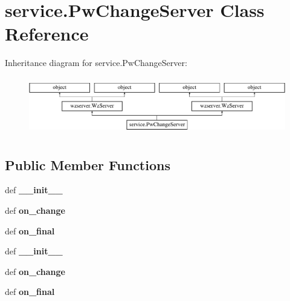 \hypertarget{classservice_1_1PwChangeServer}{\section{service.\-Pw\-Change\-Server Class Reference}
\label{classservice_1_1PwChangeServer}
}
Inheritance diagram for service.\-Pw\-Change\-Server\-:\begin{figure}[H]
\begin{center}
\leavevmode
\includegraphics[height=2.530120cm]{classservice_1_1PwChangeServer}
\end{center}
\end{figure}
\subsection*{Public Member Functions}
\begin{DoxyCompactItemize}
\item 
\hypertarget{classservice_1_1PwChangeServer_a4fb6862da925977587bd74bd261a8701}{def {\bfseries \-\_\-\-\_\-init\-\_\-\-\_\-}}\label{classservice_1_1PwChangeServer_a4fb6862da925977587bd74bd261a8701}

\item 
\hypertarget{classservice_1_1PwChangeServer_a6d3a67a350bc6f6310632b93d3b9dc76}{def {\bfseries on\-\_\-change}}\label{classservice_1_1PwChangeServer_a6d3a67a350bc6f6310632b93d3b9dc76}

\item 
\hypertarget{classservice_1_1PwChangeServer_a1364ecbaf8211611b793345d73249eac}{def {\bfseries on\-\_\-final}}\label{classservice_1_1PwChangeServer_a1364ecbaf8211611b793345d73249eac}

\item 
\hypertarget{classservice_1_1PwChangeServer_a4fb6862da925977587bd74bd261a8701}{def {\bfseries \-\_\-\-\_\-init\-\_\-\-\_\-}}\label{classservice_1_1PwChangeServer_a4fb6862da925977587bd74bd261a8701}

\item 
\hypertarget{classservice_1_1PwChangeServer_a6d3a67a350bc6f6310632b93d3b9dc76}{def {\bfseries on\-\_\-change}}\label{classservice_1_1PwChangeServer_a6d3a67a350bc6f6310632b93d3b9dc76}

\item 
\hypertarget{classservice_1_1PwChangeServer_a1364ecbaf8211611b793345d73249eac}{def {\bfseries on\-\_\-final}}\label{classservice_1_1PwChangeServer_a1364ecbaf8211611b793345d73249eac}

\end{DoxyCompactItemize}

